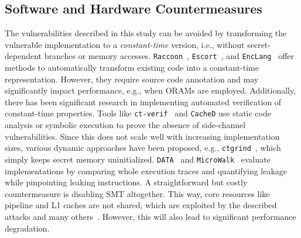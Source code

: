 \subsection{Software and Hardware Countermeasures}
The vulnerabilities described in this study can be avoided by transforming the vulnerable implementation to a \emph{constant-time} version, i.e., without secret-dependent branches or memory accesses.
\texttt{Raccoon}~\cite{rane2015raccoon}, \texttt{Escort}~\cite{rane2016secure}, and \texttt{EncLang}~\cite{sinha2017compiler} offer methods to automatically transform existing code into a constant-time representation. However, they require source code annotation and may significantly impact performance, e.g., when ORAMs are employed. Additionally, there has been significant research in implementing automated verification of constant-time properties. Tools like \texttt{ct-verif}~\cite{almeida2016verifying} and \texttt{CacheD} use static code analysis or symbolic execution to prove the absence of side-channel vulnerabilities. Since this does not scale well with increasing implementation sizes, various dynamic approaches have been proposed, e.g., \texttt{ctgrind}~\cite{langley2010ctgrind}, which simply keeps secret memory uninitialized. \texttt{DATA}~\cite{weiser2018data} and \texttt{MicroWalk}~\cite{wichelmann2018microwalk} evaluate implementations by comparing whole execution traces and quantifying leakage while pinpointing leaking instructions. 
A straightforward but costly countermeasure is disabling SMT altogether. This way, core resources like pipeline and L1 caches are not shared, which are exploited by the described attacks and many others~\cite{aciiccmez2007yet,aciiccmez2010new}. However, this will also lead to significant performance degradation. 
